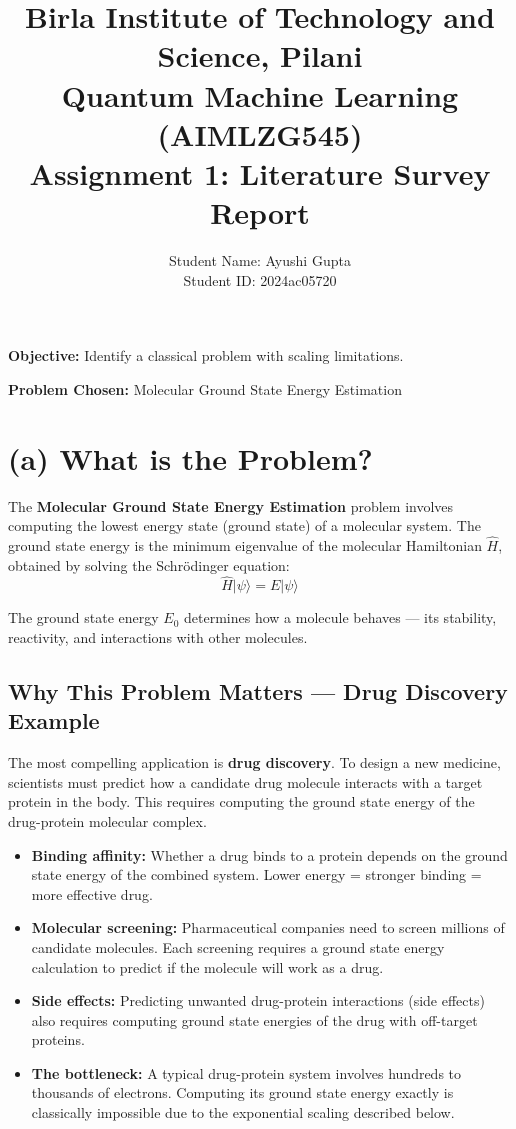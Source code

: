 \documentclass[11pt]{article}
\title{
\textbf{Birla Institute of Technology and Science, Pilani}\\
\textbf{Quantum Machine Learning (AIMLZG545)}\\
\vspace{0.3cm}
\textbf{Assignment 1: Literature Survey Report}
}
\author{
Student Name: Ayushi Gupta \\
Student ID: 2024ac05720
}
\date{}
\begin{document}
\maketitle

\textbf{Objective:} Identify a classical problem with scaling limitations.

\textbf{Problem Chosen:} Molecular Ground State Energy Estimation

\section*{(a) What is the Problem?}

The \textbf{Molecular Ground State Energy Estimation} problem involves computing the lowest energy state (ground state) of a molecular system. The ground state energy is the minimum eigenvalue of the molecular Hamiltonian $\hat{H}$, obtained by solving the Schr\"{o}dinger equation:
\[
\hat{H}|\psi\rangle = E|\psi\rangle
\]

The ground state energy $E_0$ determines how a molecule behaves --- its stability, reactivity, and interactions with other molecules.

\subsection*{Why This Problem Matters --- Drug Discovery Example}

The most compelling application is \textbf{drug discovery}. To design a new medicine, scientists must predict how a candidate drug molecule interacts with a target protein in the body. This requires computing the ground state energy of the drug-protein molecular complex.

\begin{itemize}
    \item \textbf{Binding affinity:} Whether a drug binds to a protein depends on the ground state energy of the combined system. Lower energy = stronger binding = more effective drug.
    \item \textbf{Molecular screening:} Pharmaceutical companies need to screen millions of candidate molecules. Each screening requires a ground state energy calculation to predict if the molecule will work as a drug.
    \item \textbf{Side effects:} Predicting unwanted drug-protein interactions (side effects) also requires computing ground state energies of the drug with off-target proteins.
    \item \textbf{The bottleneck:} A typical drug-protein system involves hundreds to thousands of electrons. Computing its ground state energy exactly is classically impossible due to the exponential scaling described below.
\end{itemize}
\end{document}

